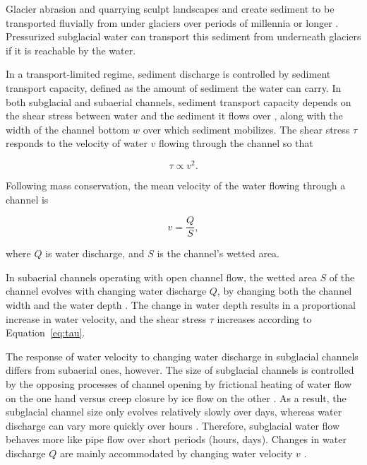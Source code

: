 \documentclass[esurf, manuscript]{copernicus}
\begin{document}
Glacier abrasion and quarrying sculpt landscapes and create sediment to be transported fluvially from under glaciers over periods of millennia or longer \citep[c.f.][]{hallet1979,iverson2012,ugelvig2018}.
Pressurized subglacial water can transport this sediment from underneath glaciers \citep{walder1994,creyts2013,beaud2018,delaney2019} if it is reachable by the water.

In a transport-limited regime, sediment discharge is controlled by sediment transport capacity, defined as the amount of sediment the water can carry.
In both subglacial and subaerial channels, sediment transport capacity depends on the shear stress between water and the sediment it flows over \citep{shields1936,meyer1948,engelund1967}, along with the width of the channel bottom $w$ over which sediment mobilizes.
The shear stress $\tau$ responds to the velocity of water $v$ flowing through the channel so that
\begin{linenomath*}
  \begin{equation}
    \label{eq:tau}
    \tau \propto v^2.
  \end{equation}
\end{linenomath*}
% 
Following mass conservation, the mean velocity of the water flowing through a  channel is
\begin{linenomath*}
  \begin{equation}
    \label{eq:v}
    v = \frac{Q}{S},
  \end{equation}
\end{linenomath*}
where $Q$ is water discharge,  and $S$ is the channel's wetted area. 

In subaerial channels operating with open channel flow, the wetted area $S$ of the channel evolves with changing water discharge $Q$, by changing both the channel width and the water depth \citep{leopold1953}.
The change in water depth results in a proportional increase in water velocity, and the shear stress $\tau$ increases according to Equation~\ref{eq:tau}.

The response of water velocity to changing water discharge in subglacial channels differs from subaerial ones, however.
The size of subglacial channels is controlled by the opposing processes of channel opening by frictional heating of water flow on the one hand versus creep closure by ice flow on the other \citep{rothlisberger1972}.
As a result, the subglacial channel size only evolves relatively slowly over days, whereas water discharge can vary more quickly over hours \citep[e.g.][]{iken1986,andrews2014,nanni2020}.
Therefore, subglacial water flow behaves more like pipe flow over short periods (hours, days).
Changes in water discharge $Q$ are mainly accommodated by changing water velocity $v$ \citep[Equation~\ref{eq:v} and Figure~\ref{fig:cartoon}; ][]{alley1997}.
\end{document}
